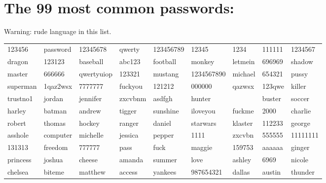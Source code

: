 \documentclass{tufte-handout}
\begin{document}
\section{The 99 most common passwords:}

Warning: rude language in this list.

\begin{tabular}{lllllllll}

123456 & password & 12345678 & qwerty & 123456789 & 12345 & 1234 & 111111 & 1234567 \\
dragon & 123123 & baseball & abc123 & football & monkey & letmein & 696969 & shadow \\
master & 666666 & qwertyuiop & 123321 & mustang & 1234567890 & michael & 654321 & pussy \\
superman & 1qaz2wsx & 7777777 & fuckyou & 121212 & 000000 & qazwsx & 123qwe & killer \\
trustno1 & jordan & jennifer & zxcvbnm & asdfgh & hunter &  & buster & soccer \\
harley & batman & andrew & tigger & sunshine & iloveyou & fuckme & 2000 & charlie \\
robert & thomas & hockey & ranger & daniel & starwars & klaster & 112233 & george \\
asshole & computer & michelle & jessica & pepper & 1111 & zxcvbn & 555555 & 11111111 \\
131313 & freedom & 777777 & pass & fuck & maggie & 159753 & aaaaaa & ginger \\
princess & joshua & cheese & amanda & summer & love & ashley & 6969 & nicole \\
chelsea & biteme & matthew & access & yankees & 987654321 & dallas & austin & thunder \\
\end{tabular}
\end{document}
